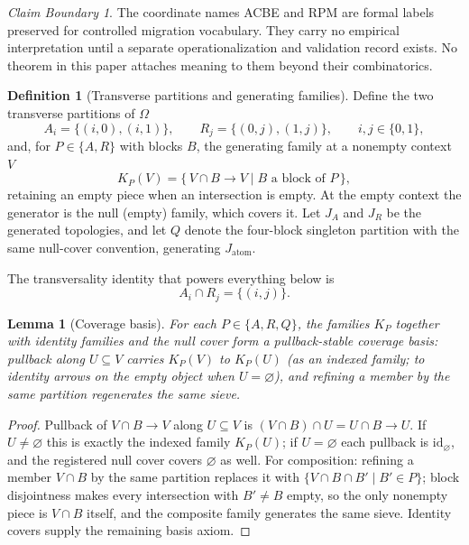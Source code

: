 \documentclass[11pt]{amsart}
\newtheorem{lemma}[theorem]{Lemma}
\theoremstyle{definition}
\newtheorem{definition}[theorem]{Definition}
\theoremstyle{remark}
\newtheorem{boundary}[theorem]{Claim Boundary}
\newcommand{\id}{\mathrm{id}}
\begin{document}
\begin{boundary}
The coordinate names ACBE and RPM are formal labels preserved for controlled migration vocabulary. They carry no empirical interpretation until a separate operationalization and validation record exists. No theorem in this paper attaches meaning to them beyond their combinatorics.
\end{boundary}

\begin{definition}[Transverse partitions and generating families]\label{def:covers}
Define the two transverse partitions of $\Omega$
\[
A_i=\{(i,0),(i,1)\}, \qquad R_j=\{(0,j),(1,j)\}, \qquad i,j\in\{0,1\},
\]
and, for $P\in\{A,R\}$ with blocks $B$, the generating family at a nonempty context $V$
\[
K_P(V)=\{\,V\cap B \to V \mid B \text{ a block of } P\,\},
\]
retaining an empty piece when an intersection is empty. At the empty context the generator is the null (empty) family, which covers it. Let $J_A$ and $J_R$ be the generated topologies, and let $Q$ denote the four-block singleton partition with the same null-cover convention, generating $J_{\mathrm{atom}}$.
\end{definition}

The transversality identity that powers everything below is
\begin{equation}\label{eq:transverse}
A_i\cap R_j=\{(i,j)\}.
\end{equation}

\begin{lemma}[Coverage basis]\label{lem:basis}
For each $P\in\{A,R,Q\}$, the families $K_P$ together with identity families and the null cover form a pullback-stable coverage basis: pullback along $U\subseteq V$ carries $K_P(V)$ to $K_P(U)$ (as an indexed family; to identity arrows on the empty object when $U=\varnothing$), and refining a member by the same partition regenerates the same sieve.
\end{lemma}

\begin{proof}
Pullback of $V\cap B\to V$ along $U\subseteq V$ is $(V\cap B)\cap U=U\cap B\to U$. If $U\neq\varnothing$ this is exactly the indexed family $K_P(U)$; if $U=\varnothing$ each pullback is $\id_\varnothing$, and the registered null cover covers $\varnothing$ as well. For composition: refining a member $V\cap B$ by the same partition replaces it with $\{V\cap B\cap B' \mid B'\in P\}$; block disjointness makes every intersection with $B'\neq B$ empty, so the only nonempty piece is $V\cap B$ itself, and the composite family generates the same sieve. Identity covers supply the remaining basis axiom.
\end{proof}
\end{document}
